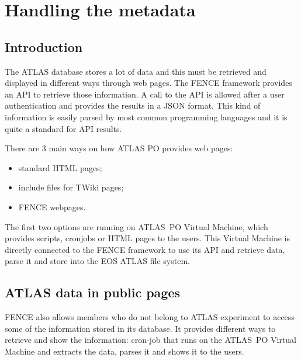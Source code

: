 
\section{Handling the metadata}
\label{sec:Handling_the_metadata}

\subsection{Introduction}

The ATLAS database stores a lot of data and this must be retrieved and displayed in different ways through web pages.
The FENCE framework provides an API to retrieve those information.
A call to the API is allowed after a user authentication and provides the results in a JSON format.
This kind of information is easily parsed by most common programming languages and it is quite a standard for API results.

There are 3 main ways on how ATLAS PO provides web pages:

\begin{itemize}
\item standard HTML pages;
\item include files for TWiki pages;
\item FENCE webpages.
\end{itemize}

The first two options are running on ATLAS~PO Virtual Machine, which provides scripts, cronjobs or HTML pages to the users.
This Virtual Machine is directly connected to the FENCE framework to use its API and retrieve data, parse it and store into the EOS ATLAS file system.


\subsection{ATLAS data in public pages}
\label{sec:ATLAS_data_in_public_pages}

FENCE also allows members who do not belong to ATLAS experiment to access some of the information stored in its database.
It provides different ways to retrieve and show the information: cron-job that runs on the ATLAS~PO Virtual Machine and extracts the data, parses it and shows it to the users.

